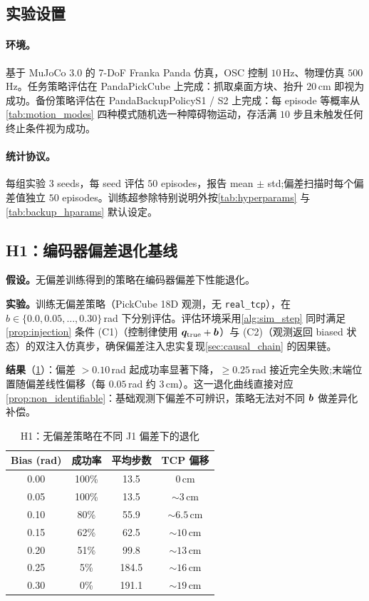 \subsection{实验设置}\label{sec:sim_exp_setup}

\paragraph{环境。}基于 MuJoCo 3.0 的 7-DoF Franka Panda 仿真，OSC 控制 $10$\,Hz、物理仿真 $500$\,Hz。任务策略评估在 PandaPickCube 上完成：抓取桌面方块、抬升 $20$\,cm 即视为成功。备份策略评估在 PandaBackupPolicyS1 / S2 上完成：每 episode 等概率从 \cref{tab:motion_modes} 四种模式随机选一种障碍物运动，存活满 $10$ 步且未触发任何终止条件视为成功。

\paragraph{统计协议。}每组实验 $3$ seeds，每 seed 评估 $50$ episodes，报告 mean $\pm$ std;偏差扫描时每个偏差值独立 $50$ episodes。训练超参除特别说明外按\cref{tab:hyperparams} 与\cref{tab:backup_hparams} 默认设定。

\subsection{H1：编码器偏差退化基线}\label{sec:exp_h1}

\textbf{假设。}无偏差训练得到的策略在编码器偏差下性能退化。

\textbf{实验。}训练无偏差策略（PickCube 18D 观测，无 \texttt{real\_tcp}），在 $b \in \{0.0, 0.05, \ldots, 0.30\}$\,rad 下分别评估。评估环境采用\cref{alg:sim_step} 同时满足\cref{prop:injection} 条件 (C1)（控制律使用 $\bm{q}_\text{true}+\bm{b}$）与 (C2)（观测返回 biased 状态）的双注入仿真步，确保偏差注入忠实复现\cref{sec:causal_chain} 的因果链。

\textbf{结果}（\cref{tab:h1_degradation}）：偏差 $> 0.10$\,rad 起成功率显著下降，$\geq 0.25$\,rad 接近完全失败;末端位置随偏差线性偏移（每 $0.05$\,rad 约 $3$\,cm）。这一退化曲线直接对应\cref{prop:non_identifiable}：基础观测下偏差不可辨识，策略无法对不同 $\bm{b}$ 做差异化补偿。

\begin{table}[htbp]
  \centering
  \caption{H1：无偏差策略在不同 J1 偏差下的退化}
  \label{tab:h1_degradation}
  \footnotesize
  \begin{tabular}{@{}cccc@{}}
    \toprule
    Bias (rad) & 成功率 & 平均步数 & TCP 偏移 \\
    \midrule
    0.00 & 100\% & 13.5 & 0\,cm \\
    0.05 & 100\% & 13.5 & $\sim 3$\,cm \\
    0.10 & 80\%  & 55.9 & $\sim 6.5$\,cm \\
    0.15 & 62\%  & 62.5 & $\sim 10$\,cm \\
    0.20 & 51\%  & 99.8 & $\sim 13$\,cm \\
    0.25 & 5\%   & 184.5 & $\sim 16$\,cm \\
    0.30 & 0\%   & 191.1 & $\sim 19$\,cm \\
    \bottomrule
  \end{tabular}
\end{table}

